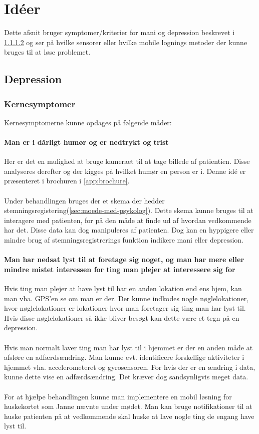 \section{Idéer}
Dette afsnit bruger symptomer/kriterier for mani og depression beskrevet i \cref{} og ser på hvilke sensorer eller hvilke mobile lognings metoder der kunne bruges til at løse problemet.

\subsection{Depression}

\subsubsection{Kernesymptomer}
Kernesymptomerne kunne opdages på følgende måder:

\paragraph{Man er i dårligt humør og er nedtrykt og trist}
Her er det en mulighed at bruge kameraet til at tage billede af patientien. Disse analyseres derefter og der kigges på hvilket humør en person er i. Denne idé er præsenteret i brochuren i \cref{app:brochure}.
\\
\\
Under behandlingen bruges der et skema der hedder stemningsregistering(\cref{sec:moede-med-psykolog}). Dette skema kunne bruges til at interagere med patienten, for på den måde at finde ud af hvordan vedkommende har det. Disse data kan dog manipuleres af patienten. Dog kan en hyppigere eller mindre brug af stemningsregistrerings funktion indikere mani eller depression.
\paragraph{Man har nedsat lyst til at foretage sig noget, og man har mere eller mindre mistet interessen for ting man plejer at interessere sig for}
Hvis ting man plejer at have lyst til har en anden lokation end ens hjem, kan man vha. GPS'en se om man er der. Der kunne indkodes nogle nøglelokationer, hvor nøglelokationer er lokationer hvor man foretager sig ting man har lyst til.
Hvis disse nøglelokationer så ikke bliver besøgt kan dette være et tegn på en depression.
\\
\\
Hvis man normalt laver ting man har lyst til i hjemmet er der en anden måde at afsløre en adfærdsændring. Man kunne evt. identificere forskellige aktiviteter i hjemmet vha. accelerometeret og gyrosensoren. For hvis der er en ændring i data, kunne dette vise en adfærdsændring. Det kræver dog sandsynligvis meget data.
\\
\\
For at hjælpe behandlingen kunne man implementere en mobil løsning for huskekortet som Janne nævnte under mødet. Man kan bruge notifikationer til at huske patienten på at vedkommende skal huske at lave nogle ting de engang have lyst til.

